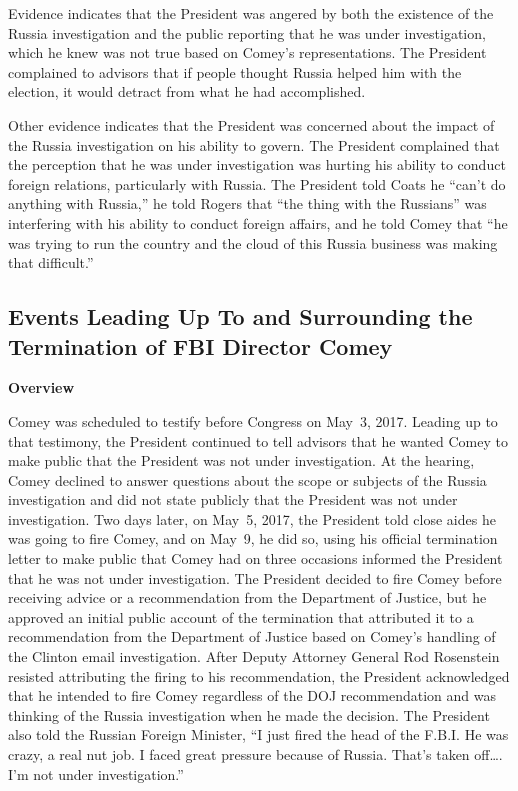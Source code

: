 Evidence indicates that the President was angered by both the existence of the Russia investigation and the public reporting that he was under investigation, which he knew was not true based on Comey's representations.
The President complained to advisors that if people thought Russia helped him with the election, it would detract from what he had accomplished.

Other evidence indicates that the President was concerned about the impact of the Russia investigation on his ability to govern.
The President complained that the perception that he was under investigation was hurting his ability to conduct foreign relations, particularly with Russia.
The President told Coats he ``can't do anything with Russia,'' he told Rogers that ``the thing with the Russians'' was interfering with his ability to conduct foreign affairs, and he told Comey that ``he was trying to run the country and the cloud of this Russia business was making that difficult.''

\subsection{Events Leading Up To and Surrounding the Termination of FBI Director Comey}

\begin{center}
\textbf{Overview}
\end{center}

Comey was scheduled to testify before Congress on May~3, 2017.
Leading up to that testimony, the President continued to tell advisors that he wanted Comey to make public that the President was not under investigation.
At the hearing, Comey declined to answer questions about the scope or subjects of the Russia investigation and did not state publicly that the President was not under investigation.
Two days later, on May~5, 2017, the President told close aides he was going to fire Comey, and on May~9, he did so, using his official termination letter to make public that Comey had on three occasions informed the President that he was not under investigation.
The President decided to fire Comey before receiving advice or a recommendation from the Department of Justice, but he approved an initial public account of the termination that attributed it to a recommendation from the Department of Justice based on Comey's handling of the Clinton email investigation.
After Deputy Attorney General Rod Rosenstein resisted attributing the firing to his recommendation, the President acknowledged that he intended to fire Comey regardless of the DOJ recommendation and was thinking of the Russia investigation when he made the decision.
The President also told the Russian Foreign Minister, ``I just fired the head of the F.B.I\null.
He was crazy, a real nut job.
I faced great pressure because of Russia.
That's taken off\dots.
I'm not under investigation.''

